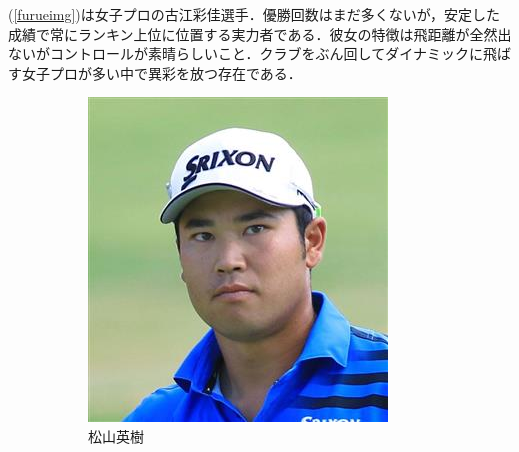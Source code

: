 \documentclass[a4j, twocolumn]{jarticle}
\begin{document}
\vspace{-15pt}

(\ref{furueimg})は女子プロの古江彩佳選手．優勝回数はまだ多くないが，安定した成績で常にランキン上位に位置する実力者である．彼女の特徴は飛距離が全然出ないがコントロールが素晴らしいこと．クラブをぶん回してダイナミックに飛ばす女子プロが多い中で異彩を放つ存在である．

\begin{figure}[htb]
    \centering
    \begin{subfigure}[b]{0.12\textwidth}
        \centering
        \includegraphics[height=\textwidth]{matuyama.jpg}
        \vspace{-1.0mm}
        \caption{松山英樹}
        \label{matuyamaimg}
    \end{subfigure}
    \begin{subfigure}[b]{0.12\textwidth}
        \centering

\end{subfigure}
\end{figure}
\end{document}
